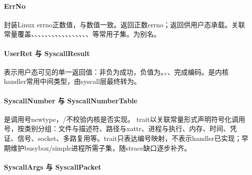 
\paragraph{ErrNo}

封装Linux errno正数值，与数值一致。返回正数errno；返回供用户态承载。关联常量覆盖、、、、、、、、、、、、、、、、、等常用子集。为别名。

\paragraph{UserRet 与 SyscallResult}

表示用户态可见的单一返回值：非负为成功，负值为。、、完成编码。是内核handler常用中间类型，由syscall层最终转为。

\paragraph{SyscallNumber 与 SyscallNumberTable}

是调用号newtype，/不校验内核是否实现。 trait以关联常量形式声明符号化调用号，按类别分组：文件与描述符、路径与xattr、进程与执行、内存、时间、凭证、信号、socket、多路复用等。trait只表达编号映射，不表示handler已实现；早期维护busybox/simple进程所需子集，随strace缺口逐步补齐。

\paragraph{SyscallArgs 与 SyscallPacket}

